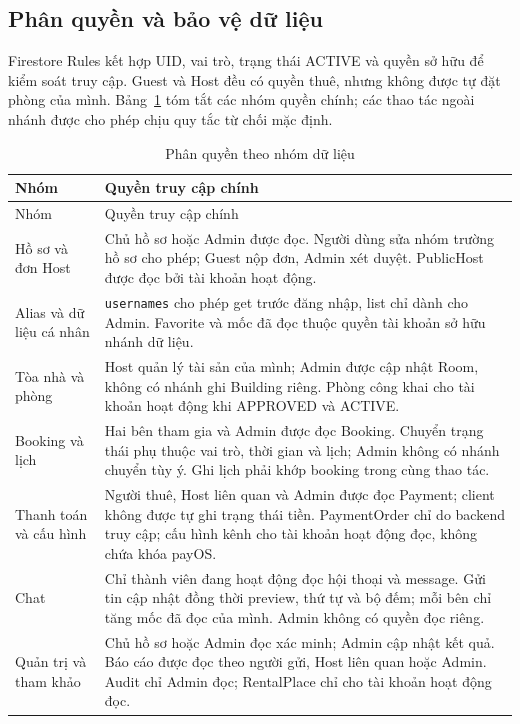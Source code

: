 \subsection{Phân quyền và bảo vệ dữ liệu}
\label{sec:ch4-security}

Firestore Rules kết hợp UID, vai trò, trạng thái ACTIVE và quyền sở hữu để kiểm soát truy cập. Guest và Host đều có quyền thuê, nhưng không được tự đặt phòng của mình. Bảng~\ref{tab:ch4-permissions} tóm tắt các nhóm quyền chính; các thao tác ngoài nhánh được cho phép chịu quy tắc từ chối mặc định.

\begingroup\small{}
\begin{longtable}{@{}>{\raggedright\arraybackslash}p{4.1cm}>{\raggedright\arraybackslash}p{11.15cm}@{}}
\caption{Phân quyền theo nhóm dữ liệu}\label{tab:ch4-permissions}\\
\toprule Nhóm & Quyền truy cập chính \\ \midrule\endfirsthead
\toprule Nhóm & Quyền truy cập chính \\ \midrule\endhead
\bottomrule\endlastfoot
Hồ sơ và đơn Host & Chủ hồ sơ hoặc Admin được đọc. Người dùng sửa nhóm trường hồ sơ cho phép; Guest nộp đơn, Admin xét duyệt. PublicHost được đọc bởi tài khoản hoạt động. \\
Alias và dữ liệu cá nhân & \texttt{usernames} cho phép get trước đăng nhập, list chỉ dành cho Admin. Favorite và mốc đã đọc thuộc quyền tài khoản sở hữu nhánh dữ liệu. \\
Tòa nhà và phòng & Host quản lý tài sản của mình; Admin được cập nhật Room, không có nhánh ghi Building riêng. Phòng công khai cho tài khoản hoạt động khi APPROVED và ACTIVE. \\
Booking và lịch & Hai bên tham gia và Admin được đọc Booking. Chuyển trạng thái phụ thuộc vai trò, thời gian và lịch; Admin không có nhánh chuyển tùy ý. Ghi lịch phải khớp booking trong cùng thao tác. \\
Thanh toán và cấu hình & Người thuê, Host liên quan và Admin được đọc Payment; client không được tự ghi trạng thái tiền. PaymentOrder chỉ do backend truy cập; cấu hình kênh cho tài khoản hoạt động đọc, không chứa khóa payOS.  \\
Chat & Chỉ thành viên đang hoạt động đọc hội thoại và message. Gửi tin cập nhật đồng thời preview, thứ tự và bộ đếm; mỗi bên chỉ tăng mốc đã đọc của mình. Admin không có quyền đọc riêng. \\
Quản trị và tham khảo & Chủ hồ sơ hoặc Admin đọc xác minh; Admin cập nhật kết quả. Báo cáo được đọc theo người gửi, Host liên quan hoặc Admin. Audit chỉ Admin đọc; RentalPlace chỉ cho tài khoản hoạt động đọc. \\
\end{longtable}\endgroup

